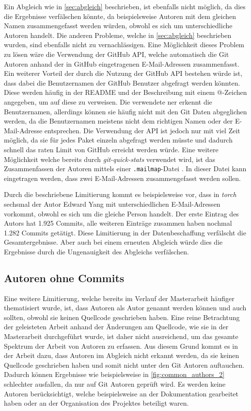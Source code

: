Ein Abgleich wie in \autoref{sec:abgleich} beschrieben, ist ebenfalls nicht möglich, da dies die Ergebnisse verfälschen könnte, da beispielsweise Autoren mit dem gleichen Namen zusammengefasst werden würden, obwohl es sich um unterschiedliche Autoren handelt.
Die anderen Probleme, welche in \autoref{sec:abgleich} beschrieben wurden, sind ebenfalls nicht zu vernachlässigen.
Eine Möglichkeit dieses Problem zu lösen wäre die Verwendung der GitHub API, welche automatisch die Git Autoren anhand der in GitHub eingetragenen E-Mail-Adressen zusammenfasst.
Ein weiterer Vorteil der durch die Nutzung der GitHub API bestehen würde ist, dass dabei die Benutzernamen der GitHub Benutzer abgefragt werden könnten.
Diese werden häufig in der README und der Beschreibung mit einem @-Zeichen angegeben, um auf diese zu verweisen.
Die verwendete \gls{ner} erkennt die Benutzernamen, allerdings können sie häufig nicht mit den Git Daten abgeglichen werden, da die Benutzernamen meistens nicht dem richtigen Namen oder der E-Mail-Adresse entsprechen.
Die Verwendung der API ist jedoch nur mit viel Zeit möglich, da sie für jedes Paket einzeln abgefragt werden müsste und dadurch schnell das raten Limit von GitHub erreicht werden würde.
Eine weitere Möglichkeit welche bereits durch \emph{git-quick-stats} verwendet wird, ist das Zusammenfassen der Autoren mittels einer \texttt{.mailmap}-Datei \autocite{chacon_git_2024-1}.
In dieser Datei kann eingetragen werden, dass zwei E-Mail-Adressen zusammengefasst werden sollen.

Durch die beschriebene Limitierung kommt es beispielsweise vor, dass in \emph{torch} sechsmal der Autor \glqq Edward Yang\grqq{} mit unterschiedlichen E-Mail-Adressen vorkommt, obwohl es sich um die gleiche Person handelt.
Der erste Eintrag des Autors hat 1.925 Commits, alle weiteren Einträge zusammen haben nochmal 1.282 Commits getätigt.
Diese Limitierung in der Datenbeschaffung verfälscht die Gesamtergebnisse.
Aber auch bei einem erneuten Abgleich würde dies die Ergebnisse durch die Ungenauigkeit des Abgleichs verfälschen.

\subsection*{Autoren ohne Commits}
\label{sec:autoren_ohne_commits}
Eine weitere Limitierung, welche bereits im Verlauf der Masterarbeit häufiger thematisiert wurde, ist, dass Autoren als Autor genannt werden können und auch sollten, obwohl sie keinen Quellcode geschrieben haben.
Eine reine Betrachtung der geleisteten Arbeit anhand der Änderungen am Quellcode, wie sie in der Masterarbeit durchgeführt wurde, ist daher nicht ausreichend, um das gesamte Spektrum der Arbeit von Autoren zu erfassen.
Aus diesem Grund kommt es in der Arbeit dazu, dass Autoren im Abgleich nicht erkannt werden, da sie keinen Quellcode geschrieben haben und somit nicht unter den Git Autoren auftauchen.
Dadurch können Ergebnisse wie beispielsweise in \autoref{fig:common_authors_2} schlechter ausfallen, da nur auf Git Autoren geprüft wird.
Es werden keine Autoren berücksichtigt, welche beispielsweise an der Dokumentation gearbeitet haben oder an der Organisation des Projektes beteiligt waren.

